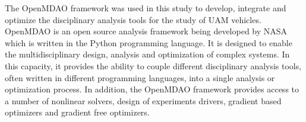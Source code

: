 The OpenMDAO framework was used in this study to develop, integrate and optimize the disciplinary analysis tools for the study of UAM vehicles.
OpenMDAO is an open source analysis framework being developed by NASA which is written in the Python programming language.\cite{gray_openmdao2010_b,gray2014automatic,openmdao}
It is designed to enable the multidisciplinary design, analysis and optimization of complex systems.
In this capacity, it provides the ability to couple different disciplinary analysis tools, often written in different programming languages, into a single analysis or optimization process.
In addition, the OpenMDAO framework provides access to a number of nonlinear solvers, design of experiments drivers, gradient based optimizers and gradient free optimizers.













